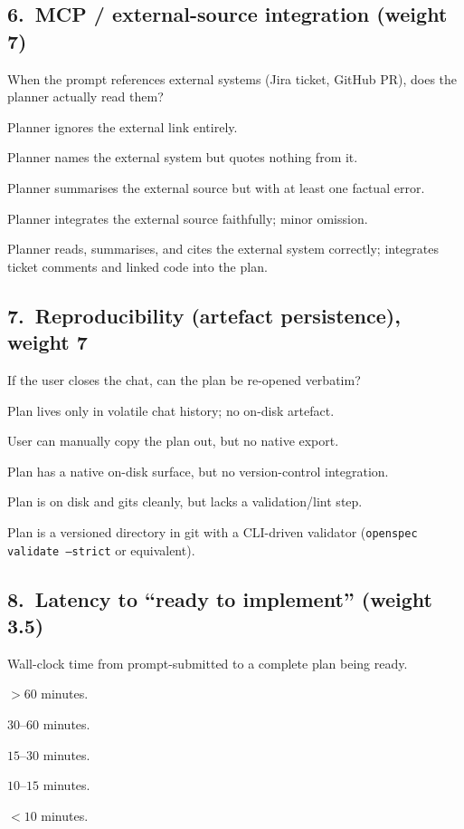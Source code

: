 \subsection*{6.\ MCP / external-source integration (weight 7)}
When the prompt references external systems (Jira ticket, GitHub PR), does the
planner actually read them?
\begin{description}[leftmargin=11mm, labelindent=0mm]
\item[1] Planner ignores the external link entirely.
\item[2] Planner names the external system but quotes nothing from it.
\item[3] Planner summarises the external source but with at least one factual error.
\item[4] Planner integrates the external source faithfully; minor omission.
\item[5] Planner reads, summarises, and cites the external system correctly; integrates ticket comments and linked code into the plan.
\end{description}

\subsection*{7.\ Reproducibility (artefact persistence), weight 7}
If the user closes the chat, can the plan be re-opened verbatim?
\begin{description}[leftmargin=11mm, labelindent=0mm]
\item[1] Plan lives only in volatile chat history; no on-disk artefact.
\item[2] User can manually copy the plan out, but no native export.
\item[3] Plan has a native on-disk surface, but no version-control integration.
\item[4] Plan is on disk and gits cleanly, but lacks a validation/lint step.
\item[5] Plan is a versioned directory in git with a CLI-driven validator (\texttt{openspec validate --strict} or equivalent).
\end{description}

\subsection*{8.\ Latency to ``ready to implement'' (weight 3.5)}
Wall-clock time from prompt-submitted to a complete plan being ready.
\begin{description}[leftmargin=11mm, labelindent=0mm]
\item[1] $> 60$ minutes.\quad
\item[2] $30$--$60$ minutes.\quad
\item[3] $15$--$30$ minutes.\quad
\item[4] $10$--$15$ minutes.\quad
\item[5] $< 10$ minutes.
\end{description}

